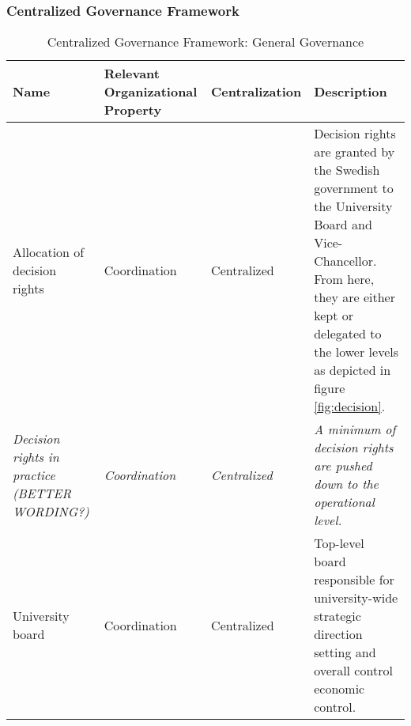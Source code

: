 \subsubsection{Centralized Governance Framework}


\begin{table}[H]
\caption{Centralized Governance Framework: General Governance}
\label{table:centralGeneralGovernance}
\begin{tabular}{ | p{} | p{}| p{} | p{}|}
%
\hline
%
\textbf{Name} & 
\textbf{Relevant Organizational Property} &
\textbf{Centralization} &  
\textbf{Description} \\
%
\hline
%
 Allocation of decision rights & 
 Coordination &
 Centralized & 
 Decision rights are granted by the Swedish government to the University Board and Vice-Chancellor. From here, they are either kept or delegated to the lower levels as depicted in figure \ref{fig:decision}. \\
%
\hline
%
 \textit{Decision rights in practice (BETTER WORDING?)} & 
 \textit{Coordination} &
 \textit{Centralized} & 
 \textit{A minimum of decision rights are pushed down to the operational level.} \\
%
\hline
%
%
%
 University board &
 Coordination &
 Centralized &
 Top-level board responsible for university-wide strategic direction setting and overall control economic control. \\
%
\hline
%
 

\end{tabular}
\end{table}
